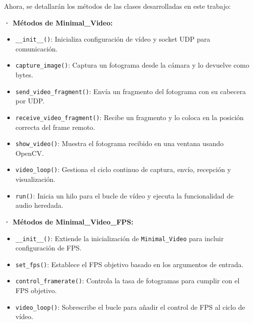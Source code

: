 Ahora, se detallarán los métodos de las clases desarrolladas en este trabajo:
\vspace{\baselineskip}

\textbf{· Métodos de Minimal\_Video:} 
\begin{itemize} 
    \item \texttt{\_\_init\_\_()}: Inicializa configuración de vídeo y socket UDP para comunicación. 
    \item \texttt{capture\_image()}: Captura un fotograma desde la cámara y lo devuelve como bytes. 
    \item \texttt{send\_video\_fragment()}: Envía un fragmento del fotograma con su cabecera por UDP. 
    \item \texttt{receive\_video\_fragment()}: Recibe un fragmento y lo coloca en la posición correcta del frame remoto. 
    \item \texttt{show\_video()}: Muestra el fotograma recibido en una ventana usando OpenCV. 
    \item \texttt{video\_loop()}: Gestiona el ciclo continuo de captura, envío, recepción y visualización. 
    \item \texttt{run()}: Inicia un hilo para el bucle de vídeo y ejecuta la funcionalidad de audio heredada. 
\end{itemize}

\textbf{· Métodos de Minimal\_Video\_FPS:} 
\begin{itemize} 
    \item \texttt{\_\_init\_\_()}: Extiende la inicialización de \texttt{Minimal\_Video} para incluir configuración de FPS. 
    \item \texttt{set\_fps()}: Establece el FPS objetivo basado en los argumentos de entrada. 
    \item \texttt{control\_framerate()}: Controla la tasa de fotogramas para cumplir con el FPS objetivo.
    \item \texttt{video\_loop()}: Sobrescribe el bucle para añadir el control de FPS al ciclo de vídeo. 
\end{itemize}

